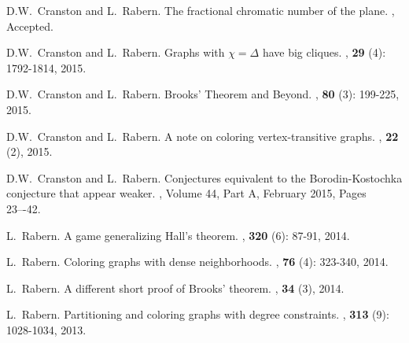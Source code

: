 \documentclass[margin,line]{res}
\begin{document}
\begin{resume}
\begin{enumerate}[{[}1{]}]
\smallskip
	
	\item
	D.W.~Cranston and L.~Rabern.
	\newblock The fractional chromatic number of the plane.
	, Accepted.
	\smallskip
	
	\item
	D.W.~Cranston and L.~Rabern.
	\newblock Graphs with $\chi = \Delta$ have big cliques.
	, \textbf{29} (4): 1792-1814, 2015.
	\smallskip
	
	\item
	D.W.~Cranston and L.~Rabern.
	\newblock Brooks' Theorem and Beyond.
	, \textbf{80} (3): 199-225, 2015.
	
	\smallskip
	
\item D.W.~Cranston and L.~Rabern.
\newblock A note on coloring vertex-transitive graphs.
, \textbf{22} (2), 2015.

\smallskip

\item
D.W.~Cranston and L.~Rabern.
\newblock Conjectures equivalent to the Borodin-Kostochka conjecture that appear weaker.
, Volume 44, Part A, February 2015, Pages 23–-42.

\smallskip

\item
L.~Rabern.
\newblock A game generalizing Hall's theorem.
, \textbf{320} (6): 87-91, 2014.

\smallskip

\item
L.~Rabern.
\newblock Coloring graphs with dense neighborhoods.
, \textbf{76} (4): 323-340, 2014.

\smallskip

\item
L.~Rabern.
\newblock A different short proof of Brooks' theorem.
,  \textbf{34} (3), 2014.

\smallskip

\item
L.~Rabern.
\newblock Partitioning and coloring graphs with degree constraints.
, \textbf{313} (9): 1028-1034, 2013.

\smallskip


\end{enumerate}
\end{resume}
\end{document}
